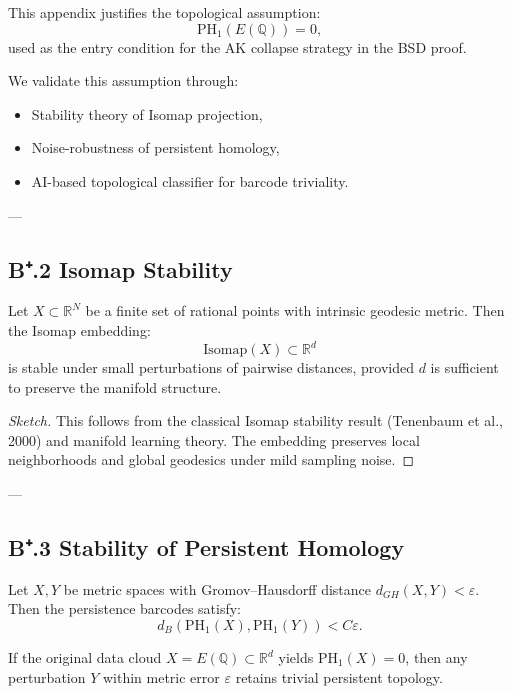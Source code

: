 This appendix justifies the topological assumption:
\[
\mathrm{PH}_1(E(\mathbb{Q})) = 0,
\]
used as the entry condition for the AK collapse strategy in the BSD proof.

We validate this assumption through:
\begin{itemize}
  \item Stability theory of Isomap projection,
  \item Noise-robustness of persistent homology,
  \item AI-based topological classifier for barcode triviality.
\end{itemize}

---

\subsection*{B⁺.2 Isomap Stability}

\begin{proposition}
Let \( X \subset \mathbb{R}^N \) be a finite set of rational points with intrinsic geodesic metric.  
Then the Isomap embedding:
\[
\mathrm{Isomap}(X) \subset \mathbb{R}^d
\]
is stable under small perturbations of pairwise distances, provided \( d \) is sufficient to preserve the manifold structure.
\end{proposition}

\begin{proof}[Sketch]
This follows from the classical Isomap stability result (Tenenbaum et al., 2000) and manifold learning theory.  
The embedding preserves local neighborhoods and global geodesics under mild sampling noise.
\end{proof}

---

\subsection*{B⁺.3 Stability of Persistent Homology}

\begin{theorem}
Let \( X, Y \) be metric spaces with Gromov–Hausdorff distance \( d_{GH}(X, Y) < \varepsilon \).  
Then the persistence barcodes satisfy:
\[
d_B(\mathrm{PH}_1(X), \mathrm{PH}_1(Y)) < C \varepsilon.
\]
\end{theorem}

\begin{corollary}
If the original data cloud \( X = E(\mathbb{Q}) \subset \mathbb{R}^d \) yields \( \mathrm{PH}_1(X) = 0 \),  
then any perturbation \( Y \) within metric error \( \varepsilon \) retains trivial persistent topology.
\end{corollary}

